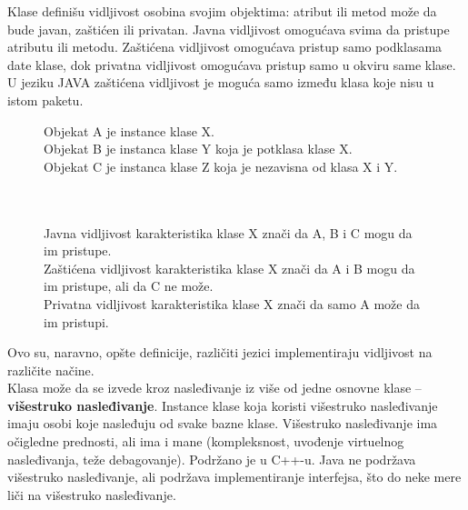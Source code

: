 \documentclass[../main.tex]{subfiles}
\begin{document}
Klase definišu vidljivost osobina svojim objektima: atribut ili metod može da bude javan, zaštićen ili privatan. Javna vidljivost omogućava svima da pristupe atributu ili metodu. Zaštićena vidljivost omogućava pristup samo podklasama date klase, dok privatna vidljivost omogućava pristup samo u okviru same klase. U jeziku JAVA zaštićena vidljivost je moguća samo između klasa koje nisu u istom paketu.

\begin{figure}[h]
\begin{boxprimer}

Objekat A je instance klase X.\\
Objekat B je instanca klase Y koja je potklasa klase X.\\
Objekat C je instanca klase Z koja je nezavisna od klasa X i Y.\\
\\
\\
Javna vidljivost karakteristika klase X znači da A, B i C mogu da im pristupe.\\
Zaštićena vidljivost karakteristika klase X znači da A i B mogu da im pristupe, ali da C ne može.\\
Privatna vidljivost karakteristika klase X znači da samo A može da im pristupi.
\end{boxprimer}
\end{figure}
Ovo su, naravno, opšte definicije, različiti jezici implementiraju vidljivost na različite načine.
\\
Klasa može da se izvede kroz nasleđivanje iz više od jedne osnovne klase -- {\bf višestruko nasleđivanje}. Instance klase koja koristi višestruko nasleđivanje imaju osobi koje nasleđuju od svake bazne klase. Višestruko nasleđivanje ima očigledne prednosti, ali ima i mane (kompleksnost, uvođenje virtuelnog nasleđivanja, teže debagovanje). Podržano je u C++-u. Java ne podržava višestruko nasleđivanje, ali podržava implementiranje interfejsa, što do neke mere liči na višestruko nasleđivanje.
\end{document}

